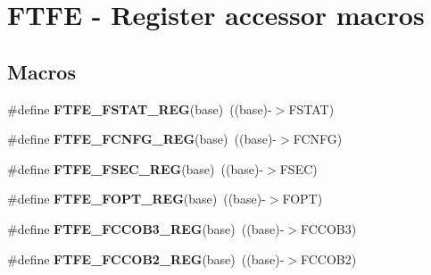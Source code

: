 \hypertarget{group__FTFE__Register__Accessor__Macros}{}\section{F\+T\+FE -\/ Register accessor macros}
\label{group__FTFE__Register__Accessor__Macros}
\subsection*{Macros}
\begin{DoxyCompactItemize}
\item 
\#define {\bfseries F\+T\+F\+E\+\_\+\+F\+S\+T\+A\+T\+\_\+\+R\+EG}(base)~((base)-\/$>$F\+S\+T\+AT)\hypertarget{group__FTFE__Register__Accessor__Macros_gabf4c2c796498e31d693220b4d239fd14}{}\label{group__FTFE__Register__Accessor__Macros_gabf4c2c796498e31d693220b4d239fd14}

\item 
\#define {\bfseries F\+T\+F\+E\+\_\+\+F\+C\+N\+F\+G\+\_\+\+R\+EG}(base)~((base)-\/$>$F\+C\+N\+FG)\hypertarget{group__FTFE__Register__Accessor__Macros_ga84f13fddb592a3aa6deada1bdaa73c52}{}\label{group__FTFE__Register__Accessor__Macros_ga84f13fddb592a3aa6deada1bdaa73c52}

\item 
\#define {\bfseries F\+T\+F\+E\+\_\+\+F\+S\+E\+C\+\_\+\+R\+EG}(base)~((base)-\/$>$F\+S\+EC)\hypertarget{group__FTFE__Register__Accessor__Macros_ga7070219abf6f2894a7d5ae36062e3fe5}{}\label{group__FTFE__Register__Accessor__Macros_ga7070219abf6f2894a7d5ae36062e3fe5}

\item 
\#define {\bfseries F\+T\+F\+E\+\_\+\+F\+O\+P\+T\+\_\+\+R\+EG}(base)~((base)-\/$>$F\+O\+PT)\hypertarget{group__FTFE__Register__Accessor__Macros_ga8a733c7eb8ef5ff59083a0cef26b9389}{}\label{group__FTFE__Register__Accessor__Macros_ga8a733c7eb8ef5ff59083a0cef26b9389}

\item 
\#define {\bfseries F\+T\+F\+E\+\_\+\+F\+C\+C\+O\+B3\+\_\+\+R\+EG}(base)~((base)-\/$>$F\+C\+C\+O\+B3)\hypertarget{group__FTFE__Register__Accessor__Macros_ga0bcf88852ed1511003c2a4ee39327d0a}{}\label{group__FTFE__Register__Accessor__Macros_ga0bcf88852ed1511003c2a4ee39327d0a}

\item 
\#define {\bfseries F\+T\+F\+E\+\_\+\+F\+C\+C\+O\+B2\+\_\+\+R\+EG}(base)~((base)-\/$>$F\+C\+C\+O\+B2)\hypertarget{group__FTFE__Register__Accessor__Macros_gaf135ce2a8d28ce18ad16bd8b965d6546}{}\label{group__FTFE__Register__Accessor__Macros_gaf135ce2a8d28ce18ad16bd8b965d6546}


\end{DoxyCompactItemize}
